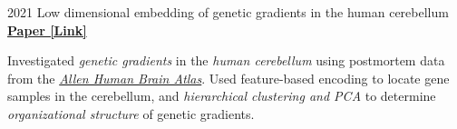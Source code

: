 \begin{cventries}
  \cventry
    {2021} %
    {Low dimensional embedding of genetic gradients in the human cerebellum} %
    {\href{https://papers.ssrn.com/sol3/papers.cfm?abstract_id=3797269}{\textbf{Paper [Link]}}}
    {}
    {
      \begin{cvitems} %
      	\item {Investigated \textit{genetic gradients} in the \textit{human cerebellum} using postmortem data from the \href{https://human.brain-map.org/}{\textit{Allen Human Brain Atlas}}. Used feature-based encoding to locate gene samples in the cerebellum, and \textit{hierarchical clustering and PCA} to determine \textit{organizational structure} of genetic gradients.}
      \end{cvitems}
    }
    
    

\end{cventries}
